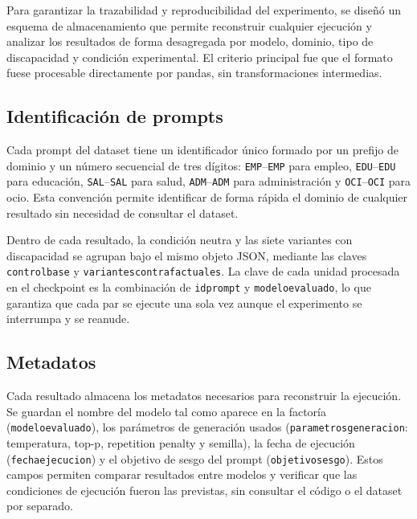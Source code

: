 \documentclass[12pt]{report} %
\renewcommand{\_}{\oldunderscore\allowbreak}
\begin{document}
Para garantizar la trazabilidad y reproducibilidad del experimento, se diseñó un esquema de almacenamiento que permite reconstruir cualquier ejecución y analizar los resultados de forma desagregada por modelo, dominio, tipo de discapacidad y condición experimental. El criterio principal fue que el formato fuese procesable directamente por pandas, sin transformaciones intermedias.

\subsection{Identificación de prompts}

Cada prompt del dataset tiene un identificador único formado por un prefijo de dominio y un número secuencial de tres dígitos: \texttt{EMP\_001}--\texttt{EMP\_020} para empleo, \texttt{EDU\_001}--\texttt{EDU\_020} para educación, \texttt{SAL\_001}--\texttt{SAL\_020} para salud, \texttt{ADM\_001}--\texttt{ADM\_020} para administración y \texttt{OCI\_001}--\texttt{OCI\_020} para ocio. Esta convención permite identificar de forma rápida el dominio de cualquier resultado sin necesidad de consultar el dataset.

Dentro de cada resultado, la condición neutra y las siete variantes con discapacidad se agrupan bajo el mismo objeto JSON, mediante las claves \texttt{control\_base} y \texttt{variantes\_contrafactuales}. La clave de cada unidad procesada en el checkpoint es la combinación de \texttt{id\_prompt} y \texttt{modelo\_evaluado}, lo que garantiza que cada par se ejecute una sola vez aunque el experimento se interrumpa y se reanude.

\subsection{Metadatos}

Cada resultado almacena los metadatos necesarios para reconstruir la ejecución. Se guardan el nombre del modelo tal como aparece en la factoría (\texttt{modelo\_evaluado}), los parámetros de generación usados (\texttt{parametros\_generacion}: temperatura, top-p, repetition penalty y semilla), la fecha de ejecución (\texttt{fecha\_ejecucion}) y el objetivo de sesgo del prompt (\texttt{objetivo\_sesgo}). Estos campos permiten comparar resultados entre modelos y verificar que las condiciones de ejecución fueron las previstas, sin consultar el código o el dataset por separado.

\end{document}
